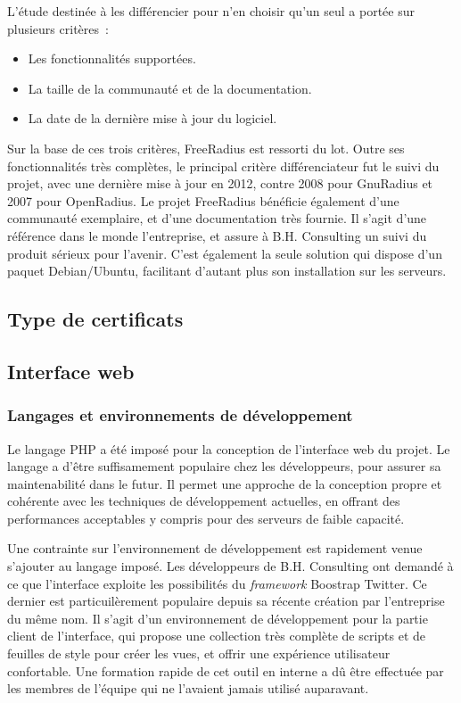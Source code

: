 L'étude destinée à les différencier pour n'en choisir qu'un seul a portée sur plusieurs critères~:

\begin{itemize}
\item Les fonctionnalités supportées.
\item La taille de la communauté et de la documentation.
\item La date de la dernière mise à jour du logiciel.
\end{itemize}

Sur la base de ces trois critères, FreeRadius est ressorti du lot. Outre ses fonctionnalités très complètes, le principal critère différenciateur fut le suivi du projet, avec une dernière mise à jour en 2012, contre 2008 pour GnuRadius et 2007 pour OpenRadius. Le projet FreeRadius bénéficie également d'une communauté exemplaire, et d'une documentation très fournie. Il s'agit d'une référence dans le monde l'entreprise, et assure à B.H. Consulting un suivi du produit sérieux pour l'avenir. C'est également la seule solution qui dispose d'un paquet Debian/Ubuntu, facilitant d'autant plus son installation sur les serveurs.

\subsection{Type de certificats}


\subsection{Interface web}
\subsubsection{Langages et environnements de développement}

Le langage PHP a été imposé pour la conception de l'interface web du projet. Le langage a d'être suffisamement populaire chez les développeurs, pour assurer sa maintenabilité dans le futur. Il permet une approche de la conception propre et cohérente avec les techniques de développement actuelles, en offrant des performances acceptables y compris pour des serveurs de faible capacité.

Une contrainte sur l'environnement de développement est rapidement venue s'ajouter au langage imposé. Les développeurs de B.H. Consulting ont demandé à ce que l'interface exploite les possibilités du \textit{framework} Boostrap Twitter. Ce dernier est particuilèrement populaire depuis sa récente création par l'entreprise du même nom. Il s'agit d'un environnement de développement pour la partie client de l'interface, qui propose une collection très complète de scripts et de feuilles de style pour créer les vues, et offrir une expérience utilisateur confortable. Une formation rapide de cet outil en interne a dû être effectuée par les membres de l'équipe qui ne l'avaient jamais utilisé auparavant.

